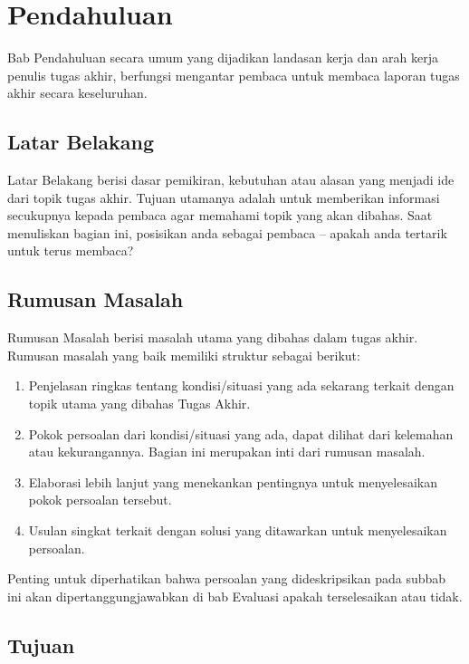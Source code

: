\chapter{Pendahuluan}

Bab Pendahuluan secara umum yang dijadikan landasan kerja dan arah kerja penulis tugas akhir, berfungsi mengantar pembaca untuk membaca laporan tugas akhir secara keseluruhan.

\section{Latar Belakang}
\label{sec:latarbelakang}

Latar Belakang berisi dasar pemikiran, kebutuhan atau alasan yang menjadi ide dari topik tugas akhir. Tujuan utamanya adalah untuk memberikan informasi secukupnya kepada pembaca agar memahami topik yang akan dibahas.  Saat menuliskan bagian ini, posisikan anda sebagai pembaca – apakah anda tertarik untuk terus membaca?

\section{Rumusan Masalah}

Rumusan Masalah berisi masalah utama yang dibahas dalam tugas akhir. Rumusan masalah yang baik memiliki struktur sebagai berikut:

\begin{enumerate}
    \item Penjelasan ringkas tentang kondisi/situasi yang ada sekarang terkait dengan topik utama yang dibahas Tugas Akhir.
    \item Pokok persoalan dari kondisi/situasi yang ada, dapat dilihat dari kelemahan atau kekurangannya. Bagian ini merupakan inti dari rumusan masalah.
    \item Elaborasi lebih lanjut yang menekankan pentingnya untuk menyelesaikan pokok persoalan tersebut.
    \item Usulan singkat terkait dengan solusi yang ditawarkan untuk menyelesaikan persoalan.
\end{enumerate}

Penting untuk diperhatikan bahwa persoalan yang dideskripsikan pada subbab ini akan dipertanggungjawabkan di bab Evaluasi apakah terselesaikan atau tidak.

\section{Tujuan}

